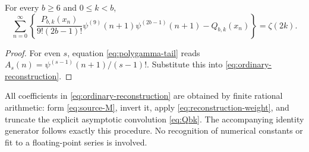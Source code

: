 \begin{corollary}
\label{cor:polygamma-reconstruction}
For every $b\ge6$ and $0\le k<b$,
\begin{equation}
 \sum_{n=0}^{\infty}
 \left\{
 \frac{P_{b,k}(x_n)}{9!(2b-1)!}
 \psi^{(9)}(n+1)\psi^{(2b-1)}(n+1)
 -Q_{b,k}(x_n)
 \right\}=\zeta(2k).
 \label{eq:polygamma-reconstruction}
\end{equation}
\end{corollary}

\begin{proof}
For even $s$, equation \eqref{eq:polygamma-tail} reads
$A_s(n)=\psi^{(s-1)}(n+1)/(s-1)!$.  Substitute this into
\eqref{eq:ordinary-reconstruction}.
\end{proof}

\begin{remark}
All coefficients in \eqref{eq:ordinary-reconstruction} are obtained by
finite rational arithmetic: form \eqref{eq:source-M}, invert it, apply
\eqref{eq:reconstruction-weight}, and truncate the explicit asymptotic
convolution \eqref{eq:Qbk}.  The accompanying identity generator follows
exactly this procedure.  No recognition of numerical constants or fit
to a floating-point series is involved.
\end{remark}
